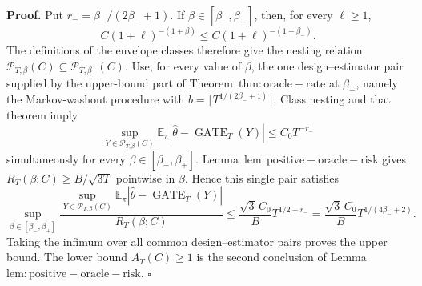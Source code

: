 \textbf{Proof.} Put \(r_-=\beta_-/(2\beta_-+1)\). If \(\beta\in[\beta_-,\beta_+]\), then, for every \(\ell\ge1\), \[C(1+\ell)^{-(1+\beta)}\le C(1+\ell)^{-(1+\beta_-)}.\] The definitions of the envelope classes therefore give the nesting relation \(\mathcal P_{T,\beta}(C)\subseteq\mathcal P_{T,\beta_-}(C)\). Use, for every value of \(\beta\), the one design--estimator pair supplied by the upper-bound part of Theorem~\(\mathrm{thm:oracle-rate}\) at \(\beta_-\), namely the Markov-washout procedure with \(b=\lceil T^{1/(2\beta_-+1)}\rceil\). Class nesting and that theorem imply \[\sup_{Y\in\mathcal P_{T,\beta}(C)}\mathbb E_\pi\left|\widehat\theta-\operatorname{GATE}_T(Y)\right|\le C_0T^{-r_-}\] simultaneously for every \(\beta\in[\beta_-,\beta_+]\). Lemma~\(\mathrm{lem:positive-oracle-risk}\) gives \(R_T(\beta;C)\ge B/\sqrt{3T}\) pointwise in \(\beta\). Hence this single pair satisfies \[\sup_{\beta\in[\beta_-,\beta_+]}\frac{\sup_{Y\in\mathcal P_{T,\beta}(C)}\mathbb E_\pi|\widehat\theta-\operatorname{GATE}_T(Y)|}{R_T(\beta;C)}\le \frac{\sqrt3\,C_0}{B}T^{1/2-r_-}=\frac{\sqrt3\,C_0}{B}T^{1/(4\beta_-+2)}.\] Taking the infimum over all common design--estimator pairs proves the upper bound. The lower bound \(A_T(C)\ge1\) is the second conclusion of Lemma~\(\mathrm{lem:positive-oracle-risk}\). \(\square\)